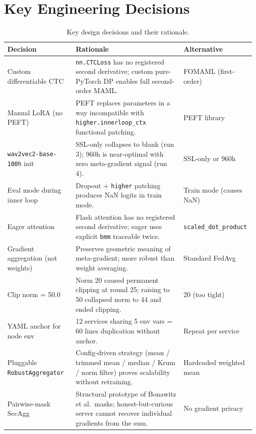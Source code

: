 \documentclass[12pt]{article}
\theoremstyle{plain}
\begin{document}
\section{Key Engineering Decisions}
\label{sec:decisions}

\begin{table}[H]
\centering
\caption{Key design decisions and their rationale.}
\label{tab:decisions}
\begin{tabular}{p{3.8cm} p{5.8cm} p{3.0cm}}
\toprule
\textbf{Decision} & \textbf{Rationale} & \textbf{Alternative} \\
\midrule
Custom differentiable CTC &
  \texttt{nn.CTCLoss} has no registered second derivative; custom pure-PyTorch
  DP enables full second-order MAML. &
  FOMAML (first-order) \\
Manual LoRA (no PEFT) &
  PEFT replaces parameters in a way incompatible with \texttt{higher.innerloop\_ctx}
  functional patching. &
  PEFT library \\
\texttt{wav2vec2-base-100h} init &
  SSL-only collapses to blank (run 3); 960h is near-optimal with zero
  meta-gradient signal (run 4). &
  SSL-only or 960h \\
Eval mode during inner loop &
  Dropout + \texttt{higher} patching produces NaN logits in train mode. &
  Train mode (causes NaN) \\
Eager attention &
  Flash attention has no registered second derivative; eager uses explicit
  \texttt{bmm} traceable twice. &
  \texttt{scaled\_dot\_product} \\
Gradient aggregation (not weights) &
  Preserves geometric meaning of meta-gradient; more robust than weight averaging. &
  Standard FedAvg \\
Clip norm = 50.0 &
  Norm 20 caused permanent clipping at round 25; raising to 50 collapsed norm
  to 44 and ended clipping. &
  20 (too tight) \\
YAML anchor for node env &
  12 services sharing 5 env vars = 60 lines duplication without anchor. &
  Repeat per service \\
Pluggable \texttt{RobustAggregator} &
  Config-driven strategy (mean / trimmed mean / median / Krum / norm filter)
  proves scalability without retraining. &
  Hardcoded weighted mean \\
Pairwise-mask SecAgg &
  Structural prototype of Bonawitz et al.\ masks; honest-but-curious server
  cannot recover individual gradients from the sum. &
  No gradient privacy \\
\bottomrule
\end{tabular}
\end{table}
\end{document}
